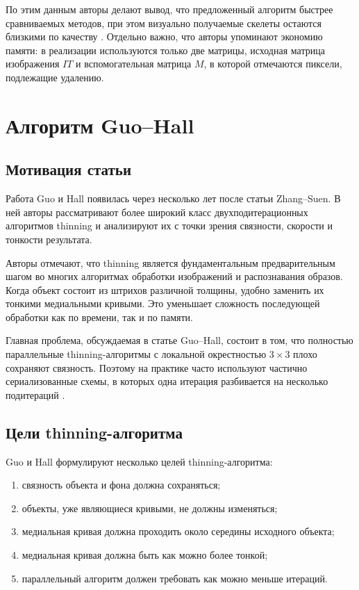 \documentclass[12pt,a4paper]{article}
\begin{document}
По этим данным авторы делают вывод, что предложенный алгоритм быстрее сравниваемых методов, при этом визуально получаемые скелеты остаются близкими по качеству \cite{zhang1984}. Отдельно важно, что авторы упоминают экономию памяти: в реализации используются только две матрицы, исходная матрица изображения $IT$ и вспомогательная матрица $M$, в которой отмечаются пиксели, подлежащие удалению.

\section{Алгоритм Guo--Hall}

\subsection{Мотивация статьи}

Работа Guo и Hall \cite{guo1989} появилась через несколько лет после статьи Zhang--Suen. В ней авторы рассматривают более широкий класс двухподитерационных алгоритмов thinning и анализируют их с точки зрения связности, скорости и тонкости результата.

Авторы отмечают, что thinning является фундаментальным предварительным шагом во многих алгоритмах обработки изображений и распознавания образов. Когда объект состоит из штрихов различной толщины, удобно заменить их тонкими медиальными кривыми. Это уменьшает сложность последующей обработки как по времени, так и по памяти.

Главная проблема, обсуждаемая в статье Guo--Hall, состоит в том, что полностью параллельные thinning-алгоритмы с локальной окрестностью $3\times3$ плохо сохраняют связность. Поэтому на практике часто используют частично сериализованные схемы, в которых одна итерация разбивается на несколько подитераций \cite{guo1989}.

\subsection{Цели thinning-алгоритма}

Guo и Hall формулируют несколько целей thinning-алгоритма:

\begin{enumerate}
    \item связность объекта и фона должна сохраняться;
    \item объекты, уже являющиеся кривыми, не должны изменяться;
    \item медиальная кривая должна проходить около середины исходного объекта;
    \item медиальная кривая должна быть как можно более тонкой;
    \item параллельный алгоритм должен требовать как можно меньше итераций.
\end{enumerate}
\end{document}
